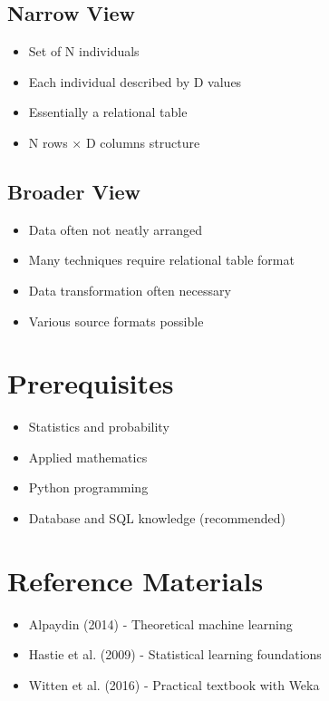 \subsection{Narrow View}
\begin{itemize}
    \item Set of N individuals
    \item Each individual described by D values
    \item Essentially a relational table
    \item N rows × D columns structure
\end{itemize}

\subsection{Broader View}
\begin{itemize}
    \item Data often not neatly arranged
    \item Many techniques require relational table format
    \item Data transformation often necessary
    \item Various source formats possible
\end{itemize}

\section{Prerequisites}
\begin{itemize}
    \item Statistics and probability
    \item Applied mathematics
    \item Python programming
    \item Database and SQL knowledge (recommended)
\end{itemize}

\section{Reference Materials}
\begin{itemize}
    \item Alpaydin (2014) - Theoretical machine learning
    \item Hastie et al. (2009) - Statistical learning foundations
    \item Witten et al. (2016) - Practical textbook with Weka
\end{itemize}